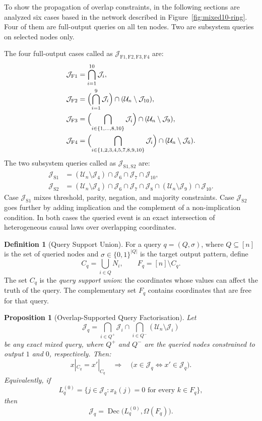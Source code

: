 \documentclass[11pt]{article}
\newtheorem{proposition}{Proposition}
\theoremstyle{definition}
\newtheorem{definition}{Definition}
\newcommand{\U}{\mathcal{U}_n}
\newcommand{\J}{\mathcal{J}}
\newcommand{\bits}{\{0,1\}}
\begin{document}
To show the propagation of overlap constraints, in the following sections are analyzed six 
cases based in the network described in
 Figure~\ref{fig:mixed10-ring}.
Four of them are 
full-output queries on all ten nodes. Two are subsystem queries on selected nodes only. 

The four full-output cases called as \(\J_{\mathrm{F1,F2,F3,F4}}\) are:
\[
\begin{aligned}
\J_{\mathrm{F1}}&=\bigcap_{i=1}^{10}\J_i,\\
\J_{\mathrm{F2}}&=\Bigl(\bigcap_{i=1}^{9}\J_i\Bigr)\cap(\U\setminus\J_{10}),\\
\J_{\mathrm{F3}}&=\Bigl(\bigcap_{i\in\{1,\dots,8,10\}}\J_i\Bigr)\cap(\U\setminus\J_{9}),\\
\J_{\mathrm{F4}}&=\Bigl(\bigcap_{i\in\{1,2,3,4,5,7,8,9,10\}}\J_i\Bigr)\cap(\U\setminus\J_{6}).
\end{aligned}
\]
The two subsystem queries called as \(\J_{\mathrm{S1,S2}}\) are:
\[
\begin{aligned}
\J_{\mathrm{S1}}
&=(\U\setminus\J_4)\cap \J_6\cap \J_7\cap \J_{10},\\
\J_{\mathrm{S2}}
&=(\U\setminus\J_4)\cap \J_6\cap \J_7\cap \J_8\cap (\U\setminus\J_9)\cap \J_{10}.
\end{aligned}
\]
Case \(\J_{\mathrm{S1}}\) mixes threshold, parity, negation, and majority constraints. 
Case \(\J_{\mathrm{S2}}\) goes further by adding implication and the complement of a 
non-implication condition. In both cases the queried event is an exact intersection 
of heterogeneous causal laws over overlapping coordinates.

\begin{definition}[Query Support Union]
For a query \(q=(Q,\sigma)\), where \(Q\subseteq [n]\) is the set of queried nodes and \(\sigma\in\bits^{|Q|}\) is the target output pattern, define
\[
C_q=\bigcup_{i\in Q}N_i,
\qquad
F_q=[n]\setminus C_q.
\]
The set \(C_q\) is the \emph{query support union}: the coordinates whose values can affect the truth of the query. The complementary set \(F_q\) contains coordinates that are free for that query.
\end{definition}

\begin{proposition}[Overlap-Supported Query Factorisation]\label{prop:overlap-factorisation}
Let
\[
\J_q=\bigcap_{i\in Q^+}\J_i \cap \bigcap_{i\in Q^-}(\U\setminus\J_i)
\]
be any exact mixed query, where \(Q^+\) and \(Q^-\) are the queried nodes constrained to output \(1\) and \(0\), respectively. Then:
\[
x|_{C_q}=x'|_{C_q}\quad \Longrightarrow \quad \bigl(x\in \J_q \iff x'\in \J_q\bigr).
\]
Equivalently, if
\[
L_q^{(0)}=\{j\in \J_q : x_k(j)=0 \text{ for every } k\in F_q\},
\]
then
\[
\J_q=\operatorname{Dec}\bigl(L_q^{(0)},\Omega(F_q)\bigr).
\]
\end{proposition}
\end{document}
